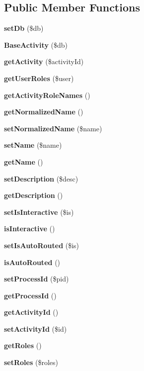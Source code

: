 \subsection*{Public Member Functions}
\begin{CompactItemize}
\item 
{\bf set\-Db} (\$db)\label{classBaseActivity_a0}

\item 
{\bf Base\-Activity} (\$db)\label{classBaseActivity_a1}

\item 
{\bf get\-Activity} (\$activity\-Id)
\item 
{\bf get\-User\-Roles} (\$user)
\item 
{\bf get\-Activity\-Role\-Names} ()
\item 
{\bf get\-Normalized\-Name} ()
\item 
{\bf set\-Normalized\-Name} (\$name)
\item 
{\bf set\-Name} (\$name)
\item 
{\bf get\-Name} ()
\item 
{\bf set\-Description} (\$desc)
\item 
{\bf get\-Description} ()
\item 
{\bf set\-Is\-Interactive} (\$is)
\item 
{\bf is\-Interactive} ()
\item 
{\bf set\-Is\-Auto\-Routed} (\$is)
\item 
{\bf is\-Auto\-Routed} ()
\item 
{\bf set\-Process\-Id} (\$pid)
\item 
{\bf get\-Process\-Id} ()
\item 
{\bf get\-Activity\-Id} ()
\item 
{\bf set\-Activity\-Id} (\$id)
\item 
{\bf get\-Roles} ()
\item 
{\bf set\-Roles} (\$roles)
\end{CompactItemize}
